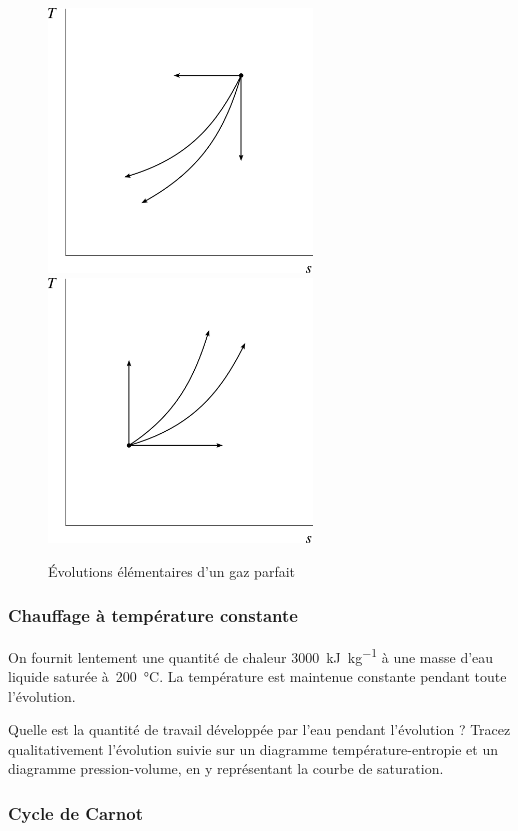 	\begin{figure}
		\begin{center}
			\includegraphics[width=7cm]{images/tsel1.png}
			\includegraphics[width=7cm]{images/tsel2.png}
		\end{center}
		\caption{Évolutions élémentaires d’un gaz parfait}
		\label{fig_tsel}
	\end{figure}


\subsubsection{Chauffage à température constante}

	On fournit lentement une quantité de chaleur \SI{3000}{\kilo\joule\per\kilogram} à une masse d’eau liquide saturée à~\SI{200}{\degreeCelsius}. La température est maintenue constante pendant toute l’évolution.
	
	Quelle est la quantité de travail développée par l’eau pendant l’évolution ? Tracez qualitativement l’évolution suivie sur un diagramme température-entropie et un diagramme pression-volume, en y représentant la courbe de saturation.
	
\subsubsection{Cycle de Carnot}

